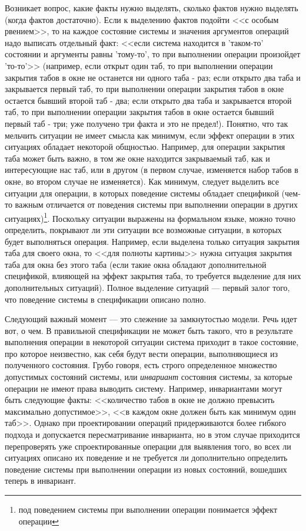\documentclass[14pt, twoside]{extreport}
\begin{document}
Возникает вопрос, какие факты нужно выделять, сколько фактов нужно выделять (когда фактов достаточно). Если к выделению фактов подойти <<с особым рвением>>, то на каждое состояние системы и значения аргументов операций надо выписать отдельный факт: <<если система находится в 'таком-то' состоянии и аргументы равны 'тому-то', то при выполнении операции произойдет 'то-то'>> (например, если открыт один таб, то при выполнении операции закрытия табов в окне не останется ни одного таба - раз; если открыто два таба и закрывается первый таб, то при выполнении операции закрытия табов в окне остается бывший второй таб - два; если открыто два таба и закрывается второй таб, то при выполнении операции закрытия табов в окне остается бывший первый таб - три; уже получено три факта и это не предел!). Понятно, что так мельчить ситуации не имеет смысла как минимум, если эффект операции в этих ситуациях обладает некоторой общностью. Например, для операции закрытия таба может быть важно, в том же окне находится закрываемый таб, как и интересующие нас таб, или в другом (в первом случае, изменяется набор табов в окне, во втором случае не изменяется). Как минимум, следует выделить все ситуации для операции, в которых поведение системы обладает спецификой (чем-то важным отличается от поведения системы при выполнении операции в других ситуациях)\footnote{под поведением системы при выполнении операции понимается эффект операции}. Поскольку ситуации выражены на формальном языке, можно точно определить, покрывают ли эти ситуации все возможные ситуации, в которых будет выполняться операция. Например, если выделена только ситуация закрытия таба для своего окна, то <<для полноты картины>> нужна ситуация закрытия таба для окна без этого таба (если такие окна обладают дополнительной спецификой, влияющей на эффект закрытия таба, то требуется выделение для них дополнительных ситуаций). Полное выделение ситуаций --- первый залог того, что поведение системы в спецификации описано полно.

Следующий важный момент --- это слежение за замкнутостью модели. Речь идет вот, о чем. В правильной спецификации не может быть такого, что в результате выполнения операции в некоторой ситуации система приходит в такое состояние, про которое неизвестно, как себя будут вести операции, выполняющиеся из полученного состояния. Грубо говоря, есть строго определенное множество допустимых состояний системы, или \emph{инвариант} состояния системы, за которые операции не имеют права выводить систему. Например, инвариантами могут быть следующие факты: <<количество табов в окне не должно превысить максимально допустимое>>, <<в каждом окне должен быть как минимум один таб>>. Однако при проектировании операций придерживаются более гибкого подхода и допускается пересматривание инварианта, но в этом случае приходится перепроверять уже спроектированные операции для выявления того, во всех ли ситуациях описано их поведение и не требуется ли дополнительно определить поведение системы при выполнении операции из новых состояний, вошедших теперь в инвариант.
\end{document}
